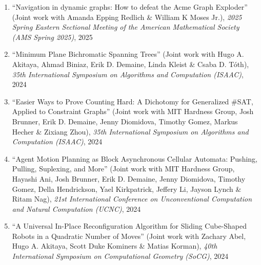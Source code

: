 \documentclass[letterpaper,11pt]{article}
\makeatletter
\newcommand{\publication}[6]{
  \item ``#1'' %
   (Joint work with#2), %
     \emph{#3}, %
      #4%


}
\newcommand{\pdficon}{\faFilePdf}
\newcommand{\doilabel}{\texttt{DOI}}
\makeatother
\begin{document}
\begin{enumerate}
        \publication
          {Navigation in dynamic graphs: How to defeat the Acme Graph Exploder}
          {
 Amanda Epping Redlich \& William K Moses Jr.}
          {2025 Spring Eastern Sectional Meeting of the American Mathematical Society (AMS Spring 2025)}
          {2025}
          {%
%
%
%
          }
          {6}
 \vspace{-.5em}  
      
        \publication
          {Minimum Plane Bichromatic Spanning Trees}
          {
 Hugo A. Akitaya, Ahmad Biniaz, Erik D. Demaine, Linda Kleist \& Csaba D. Tóth}
          {35th International Symposium on Algorithms and Computation (ISAAC)}
          {2024}
          {%
\href{https://drops.dagstuhl.de/entities/document/10.4230/LIPIcs.ISAAC.2024.4}{\pdficon}%
%
\quad\href{https://doi.org/10.4230/LIPIcs.ISAAC.2024.4}{\doilabel}%
          }
          {7}
 \vspace{-.5em}  
      
        \publication
          {Easier Ways to Prove Counting Hard: A Dichotomy for Generalized \#SAT, Applied to Constraint Graphs}
          {
 MIT Hardness Group, Josh Brunner, Erik D. Demaine, Jenny Diomidova, Timothy Gomez, Markus Hecher \& Zixiang Zhou}
          {35th International Symposium on Algorithms and Computation (ISAAC)}
          {2024}
          {%
\href{https://drops.dagstuhl.de/storage/00lipics/lipics-vol322-isaac2024/LIPIcs.ISAAC.2024.51/LIPIcs.ISAAC.2024.51.pdf}{\pdficon}%
%
\quad\href{https://doi.org/10.4230/LIPIcs.ISAAC.2024.51}{\doilabel}%
          }
          {8}
 \vspace{-.5em}  
      
        \publication
          {Agent Motion Planning as Block Asynchronous Cellular Automata: Pushing, Pulling, Suplexing, and More}
          {
 MIT Hardness Group, Hayashi Ani, Josh Brunner, Erik D. Demaine, Jenny Diomidova, Timothy Gomez, Della Hendrickson, Yael Kirkpatrick, Jeffery Li, Jayson Lynch \& Ritam Nag}
          {21st International Conference on Unconventional Computation and Natural Computation (UCNC)}
          {2024}
          {%
\href{https://link.springer.com/chapter/10.1007/978-3-031-63742-1_16}{\pdficon}%
%
\quad\href{https://doi.org/10.1007/978-3-031-63742-1_16}{\doilabel}%
          }
          {9}
 \vspace{-.5em}  
      
        \publication
          {A Universal In-Place Reconfiguration Algorithm for Sliding Cube-Shaped Robots in a Quadratic Number of Moves}
          {
 Zachary Abel, Hugo A. Akitaya, Scott Duke Kominers \& Matias Korman}
          {40th International Symposium on Computational Geometry (SoCG)}
          {2024}
          {%
\href{https://drops.dagstuhl.de/entities/document/10.4230/LIPIcs.SoCG.2024.1}{\pdficon}%
%
\quad\href{https://doi.org/10.4230/LIPIcs.SoCG.2024.1}{\doilabel}%
          }
          {10}
 \vspace{-.5em}  
      

\end{enumerate}
\end{document}
